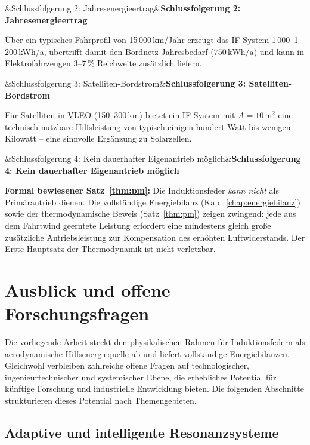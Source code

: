 ﻿\documentclass[12pt, a4paper]{report}
\newenvironment{wichtig}[1][]{%
  \begin{wichtigframe}\sloppy%
  \ifx&#1&\else\textbf{#1}\par\smallskip\fi}{\end{wichtigframe}}
\newenvironment{ergebnis}[1][]{%
  \begin{ergebnisframe}\sloppy%
  \ifx&#1&\else\textbf{#1}\par\smallskip\fi}{\end{ergebnisframe}}
\theoremstyle{definition}
\theoremstyle{remark}
\begin{document}
\begin{ergebnis}[Schlussfolgerung 2: Jahresenergieertrag]
  Über ein typisches Fahrprofil von 15\,000\,km/Jahr erzeugt das IF-System
  1\,000--1\,200\,kWh/a, übertrifft damit den Bordnetz-Jahresbedarf
  ($750\,\text{kWh/a}$) und kann in Elektrofahrzeugen 3--7\,\% Reichweite
  zusätzlich liefern.
\end{ergebnis}

\begin{ergebnis}[Schlussfolgerung 3: Satelliten-Bordstrom]
  Für Satelliten in VLEO (150--300\,km) bietet ein IF-System mit
  $A = 10\,\text{m}^2$ eine technisch nutzbare Hilfsleistung von
  typisch einigen hundert Watt bis wenigen Kilowatt -- eine sinnvolle
  Ergänzung zu Solar\-zellen.
\end{ergebnis}

\begin{wichtig}[Schlussfolgerung 4: Kein dauerhafter Eigenantrieb möglich]
  \textbf{Formal bewiesener Satz~\ref{thm:pm}:} Die Induktionsfeder \emph{kann nicht}
  als Primärantrieb dienen. Die vollständige Energiebilanz (Kap.~\ref{chap:energiebilanz})
  sowie der thermodynamische Beweis (Satz~\ref{thm:pm}) zeigen zwingend:
  jede aus dem Fahrtwind geerntete Leistung erfordert eine mindestens gleich
  große zusätzliche Antriebsleistung zur Kompensation des erhöhten Luftwiderstands.
  Der Erste Hauptsatz der Thermodynamik ist nicht verletzbar.
\end{wichtig}

\section{Ausblick und offene Forschungsfragen}
\label{sec:ausblick}

Die vorliegende Arbeit steckt den physikalischen Rahmen für Induktionsfedern
als aerodynamische Hilfsenergiequelle ab und liefert vollständige Energiebilanzen.
Gleichwohl verbleiben zahlreiche offene Fragen auf technologischer, ingenieurtechnischer
und systemischer Ebene, die erhebliches Potential für künftige Forschung und
industrielle Entwicklung bieten. Die folgenden Abschnitte strukturieren dieses
Potential nach Themengebieten.

\subsection{Adaptive und intelligente Resonanzsysteme}
\label{ssec:ausblick_resonanz}
\end{document}

